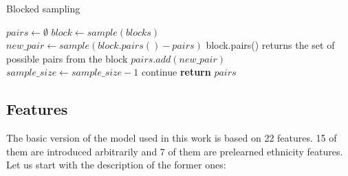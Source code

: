 \documentclass{pracamgr}
\begin{document}
\begin{algorithm}[H]
    \caption{Blocked sampling}
    \label{blocked}
    \begin{algorithmic}[1] %
         
            \State $pairs\gets \emptyset$
            	\State $block\gets sample(blocks)$
                \State $new\_pair\gets sample(block.pairs() - pairs)$
                \State \Comment block.pairs() returns the set of possible pairs from the block
                \State $pairs.add(new\_pair)$
                \State $sample\_size\gets sample\_size - 1$
                \Else
                \State continue
            	\EndIf
            \EndWhile\label{euclidendwhile}
            \State \textbf{return} $pairs$
        \EndProcedure
    \end{algorithmic}
\end{algorithm}

\subsection{Features}

The basic version of the model used in this work is based on 22 features. 15 of them are
introduced arbitrarily and 7 of them are prelearned ethnicity features. Let us start with
the description of the former ones:
\end{document}
